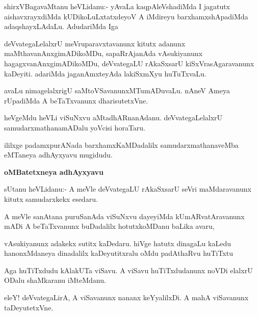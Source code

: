 \begin{mng}
shirxVBagavaMtanu heVLidanu:- yAvaLa kaqpAleVshadiMda I jagatutx aishavxrayxdiMda kUDikoLuLxtatxdeyoV A iMdireyu barxhamxshApadiMda adaqshayxLAdaLu. AdudariMda Iga
\end{mng}

\begin{mng}
deVvategaLelalxrU meVruparavxtavanunx kitutx adanunx maMthavanAnxgimADikoMDu, sapaRrAjanAda vAsukiyanunx hagagxvanAnxgimADikoMDu, deVvategaLU rAkaSxsarU kiSxVrasAgaravanunx kaDeyiti. adariMda jaganAmxteyAda lakiSxmXyu huTuTxvaLu.
\end{mng}

\begin{mng}
avaLu nimagelalxrigU saMtoVSavanunxMTumADuvaLu. nAneV Ameya rUpadiMda A beTaTxvanunx dharisutetxVne.
\end{mng}

\begin{mng}
heVgeMdu heVLi viSuNxvu aMtadhARnanAdanu. deVvategaLelalxrU samudarxmathanamADalu yoVcisi horaTaru.
\end{mng}
ililxge padamxpurANada barxhamxKaMDadalilx samudarxmathanaveMba eMTaneya adhAyxyavu mugidudu.

\begin{center}
\textbf{\large oMBatetxneya adhAyxyavu}
\end{center}

\begin{mng}
sUtanu heVLidanu:- A meVle deVvategaLU rAkaSxsarU seVri maMdaravanunx kitutx samudarxkekx esedaru.
\end{mng}

\begin{mng}
A meVle sanAtana puruSanAda viSuNxvu dayeyiMda kUmARvatAravanunx mADi A beTaTxvanunx buDadalilx hotutxkoMDanu baLika avaru,
\end{mng}

\begin{mng}
vAsukiyanunx adakekx sutitx kaDedaru. hiVge hatutx dinagaLu kaLedu hanonxMdaneya dinadalilx kaDeyutitxralu oMdu padAthaRvu huTiTxtu
\end{mng}

\begin{mng}
Aga huTiTxdudu kAlakUTa viSavu. A viSavu huTiTxdudanunx noVDi elalxrU ODalu shaMkaranu iMteMdanu.
\end{mng}

\begin{mng}
eleY! deVvategaLirA, A viSavanunx nananx keYyalilxDi. A mahA viSavanunx taDeyutetxVne.
\end{mng}

